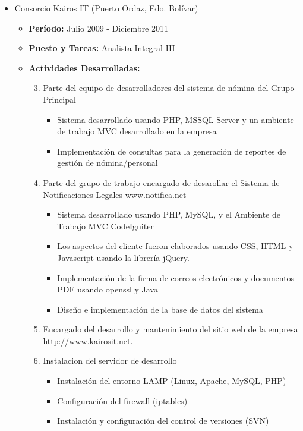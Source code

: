 \documentclass[letterpaper,12pt]{report}
\begin{document}
\begin{itemize}
        \item{Consorcio Kairos IT (Puerto Ordaz, Edo. Bolívar)}
        \begin{itemize}
        \item{\textbf{Período:} Julio 2009 - Diciembre 2011}
        \item{\textbf{Puesto y Tareas:} Analista Integral III}
        \item{\textbf{Actividades Desarrolladas:}}
            \begin{enumerate}
                \setcounter{enumi}{2}
                \item Parte del equipo de desarrolladores del sistema de nómina del Grupo Principal
                \begin{itemize}
                    \item Sistema desarrollado usando PHP, MSSQL Server y un ambiente de trabajo MVC desarrollado en la empresa
                    \item Implementación de consultas para la generación de reportes de gestión de nómina/personal
                \end{itemize}
                \item Parte del grupo de trabajo encargado de desarollar el Sistema de Notificaciones Legales www.notifica.net
                  \begin{itemize}
                    \item Sistema desarrollado usando PHP, MySQL, y el Ambiente de Trabajo MVC CodeIgniter
                    \item Los aspectos del cliente fueron elaborados usando CSS, HTML y Javascript usando la librería jQuery.
                    \item Implementación de la firma de correos electrónicos y documentos PDF usando openssl y Java
                    \item Dise\~{n}o e implementación de la base de datos del sistema
                  \end{itemize}
                \item Encargado del desarrollo y mantenimiento del sitio web de la empresa http://www.kairosit.net.
                \item Instalacion del servidor de desarrollo
                    \begin{itemize}
                        \item Instalación del entorno LAMP (Linux, Apache, MySQL, PHP)
                        \item Configuración del firewall (iptables)
                        \item Instalación y configuración del control de versiones (SVN)
                    \end{itemize}
            \end{enumerate}
        \end{itemize}



\end{itemize}
\end{document}
